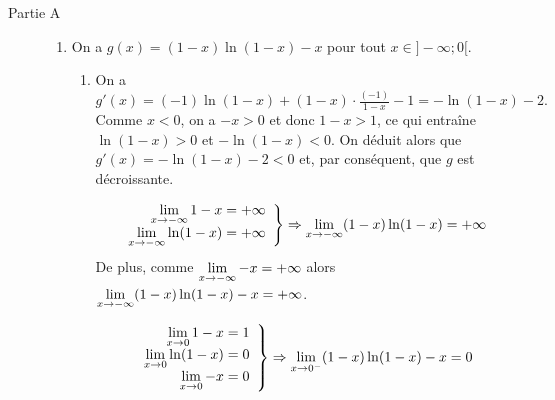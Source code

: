 	\begin{description}
		\item[Partie A]
			\begin{enumerate}
				\item On a $g(x) = (1-x) \ln (1-x) - x$ pour tout $x \in ]-\infty ;0 [$.
					\begin{enumerate}
						\item {}
							On a 
							$
								g'(x)	=	(-1) \ln (1-x) + (1-x) \cdot \frac{(-1)}{1-x} - 1
										=	- \ln (1-x) - 2 .
							$
							Comme $x<0$, on a $-x>0$ et donc $1-x>1$, ce qui entra\^ine
							$\ln(1-x)>0$ et $-\ln(1-x)<0$.
							On d\'eduit alors que $g'(x)=-\ln(1-x)-2<0$ et, par cons\'equent, que $g$ est d\'ecroissante.
								
									\begin{align*}
										\left.
											\begin{array}{r}
												\displaystyle \lim_{x\rightarrow-\infty} 1-x = +\infty			\\
												\displaystyle \lim_{x\rightarrow-\infty} \ln(1-x) = +\infty
											\end{array}
										\right\rbrace
										\Rightarrow
										\displaystyle \lim_{x\rightarrow-\infty} (1-x) \ln (1-x) = +\infty
									\end{align*}
									De plus, comme $\displaystyle \lim_{x\rightarrow-\infty} -x = +\infty$ alors 
									$\displaystyle \lim_{x\rightarrow-\infty} (1-x) \ln (1-x) - x = +\infty$.
									
									\begin{align*}
										\left.
											\begin{array}{r}
												\displaystyle \lim_{x\rightarrow 0} 1-x = 1			\\
												\displaystyle \lim_{x\rightarrow 0} \ln(1-x) = 0	\\
												\displaystyle \lim_{x\rightarrow 0} -x = 0
											\end{array}
										\right\rbrace
										\Rightarrow
										\displaystyle \lim_{x\rightarrow 0^-} (1-x) \ln (1-x) - x = 0
									\end{align*}
									

\end{enumerate}
\end{enumerate}
\end{description}
